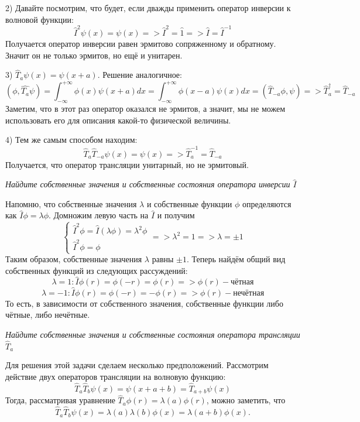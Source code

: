 2) Давайте посмотрим, что будет, если дважды применить оператор инверсии к волновой функции:
\[
\hat I^2 \psi(x) = \psi(x) => \hat I^2 = \hat 1 => \hat{I} = \hat{I}^{-1}
\]
Получается оператор инверсии равен эрмитово сопряженному и обратному. Значит он не только эрмитов, но ещё и унитарен.

3) $\hat T_a \psi(x) = \psi(x+a)$. Решение аналогичное:
\[
(\phi, \hat{T_a} \psi) = \int^{+\infty}_{-\infty} \phi(x)\psi(x+a) dx = \int^{+\infty}_{-\infty} \phi(x-a) \psi(x)dx = (\hat{T}_{-a}\phi, \psi) => \hat T^{\dagger}_a = \hat T_{-a} 
\]
Заметим, что в этот раз оператор оказался не эрмитов, а значит, мы не можем использовать его для описания какой-то физической величины.

4) Тем же самым способом находим:
\[
\hat T_a \hat T_{-a} \psi(x) = \psi(x) => \hat T_a^{-1} = \hat T_{-a}
\]
Получается, что оператор трансляции унитарный, но не эрмитовый.
\newpage
{}
\begin{center}
\textit{Найдите собственные значения и собственные состояния оператора инверсии $\hat I$}
\end{center}
Напомню, что собственные значения $\lambda$ и собственные функции $\phi$ определяются как $\hat I \phi = \lambda \phi$. Домножим левую часть на $\hat I$ и получим
\[
\begin{cases}
\hat I^2 \phi = \hat I(\lambda \phi) = \lambda^2\phi \\
\hat I^2 \phi = \phi
\end{cases}
=> \lambda^2 = 1 => \lambda = \pm 1
\]
Таким образом, собственные значения $\lambda$ равны $\pm 1$. Теперь найдём общий вид собственных функций из следующих рассуждений:
\[
\lambda = 1: \hat I \phi(r) = \phi(-r) = \phi(r) => \phi(r) - \text{чётная}
\]
\[
\lambda = -1: \hat I \phi(r) = \phi(-r) = -\phi(r) => \phi(r) - \text{нечётная}
\]
То есть, в зависимости от собственного значения, собственные функции либо чётные, либо нечётные.
\begin{center}
\textit{Найдите собственные значения и собственные состояния оператора трансляции $\hat T_a$}
\end{center}
Для решения этой задачи сделаем несколько предположений. Рассмотрим действие двух операторов трансляции на волновую функцию:
\[
\hat{T}_{a}\hat{T}_{b}\psi(x) = \psi(x + a + b) = \hat{T}_{a+b}\psi(x)
\]
Тогда, рассматривая уравнение $\hat T_a \phi(r) = \lambda(a) \phi(r)$, можно заметить, что
\[
\hat{T}_{a}\hat{T}_{b}\psi(x) = \lambda(a)\lambda(b)\phi(x) = \lambda(a+b)\phi(x).
\]
